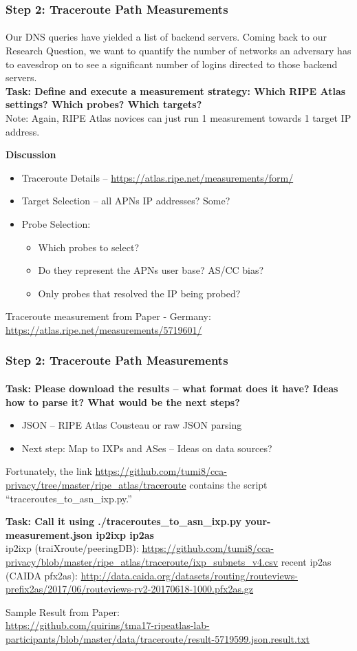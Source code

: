 \begin{frame}
\frametitle{Step 2: Traceroute Path Measurements}
\framesubtitle{}
Our DNS queries have yielded a list of backend servers. Coming back to our Research Question, we want to quantify the number of networks an adversary has to eavesdrop on to see a significant number of logins directed to those backend servers. \\
\textbf{Task: Define and execute a measurement strategy: Which RIPE Atlas settings? Which probes? Which targets?}\\
Note: Again, RIPE Atlas novices can just run 1 measurement towards 1 target IP address.

\pause
\textbf{Discussion}
\begin{itemize}
	\item Traceroute Details -- \url{https://atlas.ripe.net/measurements/form/}
	\item Target Selection -- all APNs IP addresses? Some? 
	\item Probe Selection:
	\begin{itemize}
		\item Which probes to select?
		\item Do they represent the APNs user base? AS/CC bias?
		\item Only probes that resolved the IP being probed?
	\end{itemize}
\end{itemize}

Traceroute measurement from Paper - Germany: \url{https://atlas.ripe.net/measurements/5719601/}
\end{frame}
\clearpage
\begin{frame}
\frametitle{Step 2: Traceroute Path Measurements}
\framesubtitle{}
\textbf{Task: Please download the results -- what format does it have? Ideas how to parse it? What would be the next steps?}
\pause
\begin{itemize}
	\item JSON -- RIPE Atlas Cousteau or raw JSON parsing
	\item Next step: Map to IXPs and ASes -- Ideas on data sources?
\end{itemize}
\pause
Fortunately, the link \url{https://github.com/tumi8/cca-privacy/tree/master/ripe_atlas/traceroute} contains the script ``traceroutes\_to\_asn\_ixp.py.''

\textbf{Task: Call it using ./traceroutes\_to\_asn\_ixp.py your-measurement.json ip2ixp ip2as}\\

ip2ixp (traiXroute/peeringDB): \url{https://github.com/tumi8/cca-privacy/blob/master/ripe_atlas/traceroute/ixp_subnets_v4.csv}
recent ip2as (CAIDA pfx2as): \url{http://data.caida.org/datasets/routing/routeviews-prefix2as/2017/06/routeviews-rv2-20170618-1000.pfx2as.gz}

Sample Result from Paper:\\ \url{https://github.com/quirins/tma17-ripeatlas-lab-participants/blob/master/data/traceroute/result-5719599.json.result.txt}

\end{frame}

